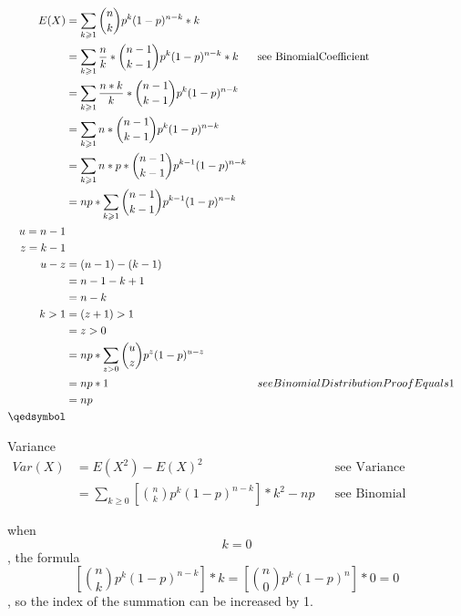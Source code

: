 \documentclass[]{article}
\begin{document}
\begin{align}
E(X) &= \sum_{k \geqslant 1} \binom{n}{k} p^k (1-p)^{n-k} * k\\
&= \sum_{k \geqslant 1} \frac{n}{k} * \binom{n-1}{k-1} p^k (1-p)^{n-k} * k && \text{see BinomialCoefficient}\\
&= \sum_{k \geqslant 1} \frac{n*k}{k} * \binom{n-1}{k-1} p^k (1-p)^{n-k}\\
&= \sum_{k \geqslant 1} n * \binom{n-1}{k-1} p^k (1-p)^{n-k}\\
&= \sum_{k \geqslant 1} n*p * \binom{n-1}{k-1} p^{k-1} (1-p)^{n-k}\\
&= np * \sum_{k \geqslant 1} \binom{n-1}{k-1} p^{k-1} (1-p)^{n-k}\\
u = n-1\\
z = k-1\\
u-z&=(n-1)-(k-1)\\
&=n-1-k+1\\
&=n-k\\
k>1&=(z+1)>1\\
&=z>0\\
&= np * \sum_{z>0} \binom{u}{z} p^{z} (1-p)^{u-z}\\
&= np * 1 && see BinomialDistributionProofEquals1\\
&= np\\
\qedsymbol
\end{align}

Variance\\
\begin{align}
	Var(X) &= E(X^2) - E(X)^2 && \text{see Variance}\\
	&= \sum_{k \geqslant 0} {[\binom{n} {k} p^k (1-p)^{n-k}]*k^2} - np && \text{see Binomial Expected Value}
\end{align}

when $$k=0$$, the formula $$[\binom{n} {k} p^k (1-p)^{n-k}] * k = [\binom{n} {0} p^k (1-p)^n] * 0 = 0$$, so the index of the summation can be increased by 1.
\end{document}
